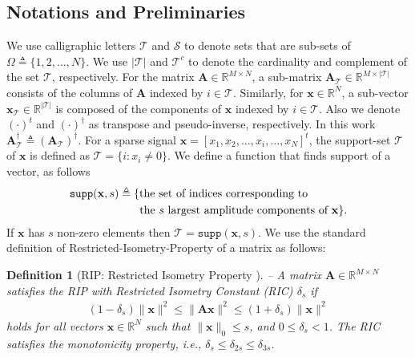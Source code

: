 \documentclass[journal]{IEEEtran}
\newcommand{\mbx}{\mathbf{x}}
\newcommand{\mbA}{\mathbf{A}}
\newcommand{\T}{\mathcal{T}}
\newcommand{\supp}{\ensuremath{\texttt{supp}}}
\newtheorem{definition}{Definition}
\begin{document}
\subsection{Notations and Preliminaries}
\label{sec:prelim}
We use calligraphic letters $\mathcal{T}$ and $\mathcal{S}$ to denote sets that are sub-sets of $\Omega \triangleq \{1, 2, \dots, N \}$. We use $|\mathcal{T}|$ and $\mathcal{T}^{c}$ to denote the cardinality and complement of the set $\mathcal{T}$, respectively.
For the matrix $\mbA \in \mathbb{R}^{M \times N}$, a sub-matrix $\mbA_{\mathcal{T}} \in \mathbb{R}^{M \times |\mathcal{T}|}$ consists of the columns of $\mbA$ indexed by $i \in \mathcal{T}$. Similarly, for $\mbx \in \mathbb{R}^{N}$, a sub-vector $\mbx_{\mathcal{T}}\in \mathbb{R}^{|\mathcal{T}|}$ is composed of the components of $\mbx$ indexed by $i \in \mathcal{T}$.
Also we denote $(\cdot)^{t}$ and $(\cdot)^{\dag}$ as transpose and pseudo-inverse, respectively. In this work $\mbA_{\mathcal{T}}^{\dag} \triangleq (\mbA_{\mathcal{T}})^{\dag}$. 
For a sparse signal $\mbx=[x_1, x_2, \hdots, x_i, \hdots, x_N]^{t}$, the support-set $\mathcal{T}$ of $\mbx$ is defined as 
$\mathcal{T} = \{ i: x_i \neq 0 \}$. 
We define a function that finds support of a vector, as follows
\begin{align} 
{\supp}(\mathbf{x}, s) & \triangleq \{ \text{the set of indices corresponding to} \nonumber \\
& \hspace{6.5mm}\text{the $s$ largest amplitude components of } \mathbf{x} \}. \nonumber 
\end{align} 
If $\mbx$ has $s$ non-zero elements then $\T = {\supp}(\mathbf{x}, s)$.
We use the standard definition of Restricted-Isometry-Property of a matrix as follows:
\begin{definition}[RIP: Restricted Isometry Property \cite{Candes_Tao_2005}]\label{def:rip} --
A matrix $\mbA \in \mathbb{R}^{M \times N}$ satisfies the RIP with Restricted Isometry Constant (RIC) $\delta_s$ if
\begin{align*}
  (1-\delta_s)\|\mbx\|^2 \leq \| \mbA \mbx \|^2 \leq (1+\delta_s) \|\mbx\|^2
\end{align*}
holds for all vectors $\mbx \in \mathbb{R}^{N}$ such that $\| \mbx \|_0 \leq s$, and $0 \leq \delta_s < 1$. The RIC satisfies the monotonicity property, i.e., $\delta_{s} \leq \delta_{2s} \leq \delta_{3s}$.
\end{definition}
\end{document}
